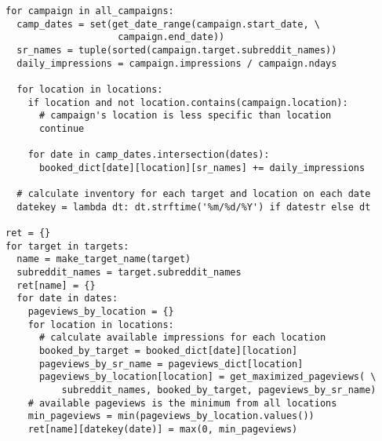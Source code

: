 \documentclass[11pt, a4paper]{article}
\begin{document}
\hrulefill
\begin{lstlisting}[caption=3 nested for-loops - 2 times in a row - in a single function]
for campaign in all_campaigns:
  camp_dates = set(get_date_range(campaign.start_date, \
					campaign.end_date))
  sr_names = tuple(sorted(campaign.target.subreddit_names))
  daily_impressions = campaign.impressions / campaign.ndays

  for location in locations:
    if location and not location.contains(campaign.location):
      # campaign's location is less specific than location
      continue

    for date in camp_dates.intersection(dates):
      booked_dict[date][location][sr_names] += daily_impressions

  # calculate inventory for each target and location on each date
  datekey = lambda dt: dt.strftime('%m/%d/%Y') if datestr else dt

ret = {}
for target in targets:
  name = make_target_name(target)
  subreddit_names = target.subreddit_names
  ret[name] = {}
  for date in dates:
    pageviews_by_location = {}
    for location in locations:
      # calculate available impressions for each location
      booked_by_target = booked_dict[date][location]
      pageviews_by_sr_name = pageviews_dict[location]
      pageviews_by_location[location] = get_maximized_pageviews( \
          subreddit_names, booked_by_target, pageviews_by_sr_name)
    # available pageviews is the minimum from all locations
    min_pageviews = min(pageviews_by_location.values())
    ret[name][datekey(date)] = max(0, min_pageviews)
\end{lstlisting}
\hrulefill
\end{document}
